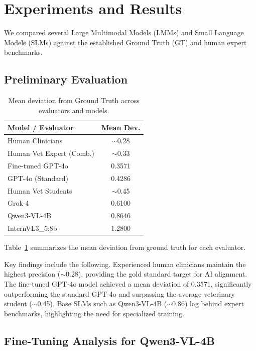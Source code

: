 \documentclass[11pt,twocolumn]{article}
\begin{document}
\section{Experiments and Results}

We compared several Large Multimodal Models (LMMs) and Small Language Models (SLMs) against the established Ground Truth (GT) and human expert benchmarks.

\subsection{Preliminary Evaluation}

\begin{table}[t]
\centering
\small
\begin{tabular}{@{}lc@{}}
\toprule
\textbf{Model / Evaluator} & \textbf{Mean Dev.} \\
\midrule
Human Clinicians          & $\sim$0.28 \\
Human Vet Expert (Comb.)  & $\sim$0.33 \\
Fine-tuned GPT-4o         & 0.3571 \\
GPT-4o (Standard)         & 0.4286 \\
Human Vet Students        & $\sim$0.45 \\
Grok-4                    & 0.6100 \\
Qwen3-VL-4B               & 0.8646 \\
InternVL3\_5:8b           & 1.2800 \\
\bottomrule
\end{tabular}
\caption{Mean deviation from Ground Truth across evaluators and models.}
\label{tab:results}
\end{table}

Table~\ref{tab:results} summarizes the mean deviation from ground truth for each evaluator. 

Key findings include the following. Experienced human clinicians maintain the highest precision ($\sim$0.28), providing the gold standard target for AI alignment. The fine-tuned GPT-4o model achieved a mean deviation of 0.3571, significantly outperforming the standard GPT-4o and surpassing the average veterinary student ($\sim$0.45). Base SLMs such as Qwen3-VL-4B ($\sim$0.86) lag behind expert benchmarks, highlighting the need for specialized training.

\subsection{Fine-Tuning Analysis for Qwen3-VL-4B}
\end{document}

